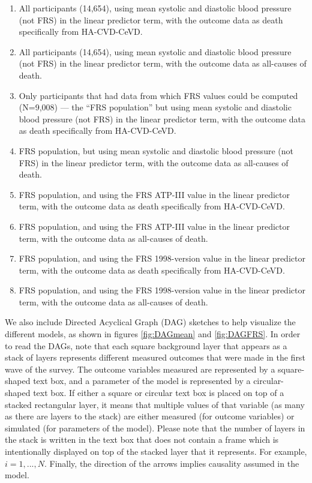 \documentclass[
]{article}
\begin{document}
\begin{enumerate}
\item All participants (14,654), using mean systolic and diastolic blood pressure (not FRS) in the linear predictor term, with the outcome data as death specifically from HA-CVD-CeVD.
\item All participants (14,654), using mean systolic and diastolic blood pressure (not FRS) in the linear predictor term, with the outcome data as all-causes of death.
\item Only participants that had data from which FRS values could be computed (N=9,008) --- the ``FRS population'' but using mean systolic and diastolic blood pressure (not FRS) in the linear predictor term, with the outcome data as death specifically from HA-CVD-CeVD.
\item FRS population, but using mean systolic and diastolic blood pressure (not FRS) in the linear predictor term, with the outcome data as all-causes of death.
\item FRS population, and using the FRS ATP-III value in the linear predictor term, with the outcome data as death specifically from HA-CVD-CeVD.
\item FRS population, and using the FRS ATP-III value in the linear predictor term, with the outcome data as all-causes of death.
\item FRS population, and using the FRS 1998-version value in the linear predictor term, with the outcome data as death specifically from HA-CVD-CeVD.
\item FRS population, and using the FRS 1998-version value in the linear predictor term, with the outcome data as all-causes of death.
\label{tab:runnums}
\end{enumerate}

We also include Directed Acyclical Graph (DAG) sketches to help visualize the different models, as shown in figures \ref{fig:DAGmean} and \ref{fig:DAGFRS}.
In order to read the DAGs, note that each square background layer that appears as a stack of layers represents different measured outcomes that were made in the first wave of the survey.
The outcome variables measured are represented by a square-shaped text box, and a parameter of the model is represented by a circular-shaped text box. If either a square or circular text box is placed on top of a stacked rectangular layer, it means that multiple values of that variable (as many as there are layers to the stack) are either measured (for outcome variables) or simulated (for parameters of the model). Please note that the number of layers in the stack is written in the text box that does not contain a frame which is intentionally displayed on top of the stacked layer that it represents. For example, \(i=1,...,N\).
Finally, the direction of the arrows implies causality assumed in the model.
\end{document}
